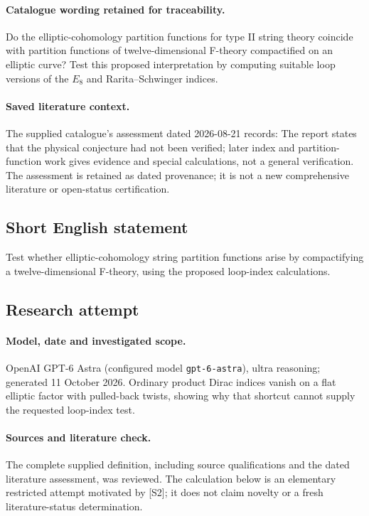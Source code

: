 \documentclass[11pt]{article}
\begin{document}
\paragraph{Catalogue wording retained for traceability.}
Do the elliptic-cohomology partition functions for type II string theory coincide with partition functions of twelve-dimensional F-theory compactified on an elliptic curve? Test this proposed interpretation by computing suitable loop versions of the $E_8$ and Rarita–Schwinger indices.

\paragraph{Saved literature context.} The supplied catalogue's assessment dated 2026-08-21 records: The report states that the physical conjecture had not been verified; later index and partition-function work gives evidence and special calculations, not a general verification. The assessment is retained as dated provenance; it is not a new comprehensive literature or open-status certification.
\subsection{Short English statement}
Test whether elliptic-cohomology string partition functions arise by compactifying a twelve-dimensional F-theory, using the proposed loop-index calculations.
\subsection{Research attempt}
\paragraph{Model, date and investigated scope.}
OpenAI GPT-6 Astra (configured model \texttt{gpt-6-astra}), ultra reasoning; generated 11 October 2026. Ordinary product Dirac indices vanish on a flat elliptic factor with pulled-back twists, showing why that shortcut cannot supply the requested loop-index test.

\paragraph{Sources and literature check.}
The complete supplied definition, including source qualifications and the dated literature assessment, was reviewed. The calculation below is an elementary restricted attempt motivated by [S2]; it does not claim novelty or a fresh literature-status determination.
\end{document}

